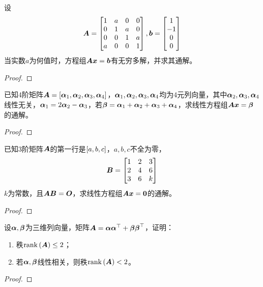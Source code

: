 \begin{problem}
设
\begin{equation*}
    \boldsymbol{A}=
    \begin{bmatrix}
        1 & a & 0 & 0 \\
        0 & 1 & a & 0 \\
        0 & 0 & 1 & a \\
        a & 0 & 0 & 1
    \end{bmatrix},
    \boldsymbol{b}=
    \begin{bmatrix}
        1 \\-1\\0\\0
    \end{bmatrix}
\end{equation*}
当实数\(a\)为何值时，方程组\(\boldsymbol{A}\boldsymbol{x}=\boldsymbol{b}\)有无穷多解，并求其通解。
\end{problem}
\begin{proof}

\end{proof}

\begin{problem}
已知\(4\)阶矩阵\(\boldsymbol{A}=\left[ \boldsymbol{\alpha}_1,\boldsymbol{\alpha}_2,\boldsymbol{\alpha}_3,\boldsymbol{\alpha}_4 \right]\)，\(\boldsymbol{\alpha}_1,\boldsymbol{\alpha}_2,\boldsymbol{\alpha}_3,\boldsymbol{\alpha}_4\)均为\(4\)元列向量，其中\(\boldsymbol{\alpha}_2,\boldsymbol{\alpha}_3,\boldsymbol{\alpha}_4\)线性无关，\(\boldsymbol{\alpha}_1=2\boldsymbol{\alpha}_2-\boldsymbol{\alpha}_3\)，若\(\boldsymbol{\beta}=\boldsymbol{\alpha}_1+\boldsymbol{\alpha}_2+\boldsymbol{\alpha}_3+\boldsymbol{\alpha}_4\)，求线性方程组\(\boldsymbol{A}\boldsymbol{x}=\boldsymbol{\beta}\)的通解。
\end{problem}
\begin{proof}

\end{proof}

\begin{problem}
已知\(3\)阶矩阵\(\boldsymbol{A}\)的第一行是\(\left[ a,b,c \right]\)，\(a,b,c\)不全为零，
\begin{equation*}
    \boldsymbol{B}=
    \begin{bmatrix}
        1 & 2 & 3 \\
        2 & 4 & 6 \\
        3 & 6 & k
    \end{bmatrix}
\end{equation*}
\(k\)为常数，且\(\boldsymbol{A}\boldsymbol{B}=\boldsymbol{O}\)，求线性方程组\(\boldsymbol{A}\boldsymbol{x}=\boldsymbol{0}\)的通解。
\end{problem}
\begin{proof}

\end{proof}

\begin{problem}
设\(\boldsymbol{\alpha},\boldsymbol{\beta}\)为三维列向量，矩阵\(\boldsymbol{A}=\boldsymbol{\alpha}\boldsymbol{\alpha}^\top+\boldsymbol{\beta}\boldsymbol{\beta}^\top\)，证明：
\begin{enumerate}
    \item 秩\(\mathrm{rank}\left( \boldsymbol{A} \right)\le2\)；
    \item 若\(\boldsymbol{\alpha},\boldsymbol{\beta}\)线性相关，则秩\(\mathrm{rank}\left( \boldsymbol{A} \right)<2\)。
\end{enumerate}
\end{problem}
\begin{proof}

\end{proof}

